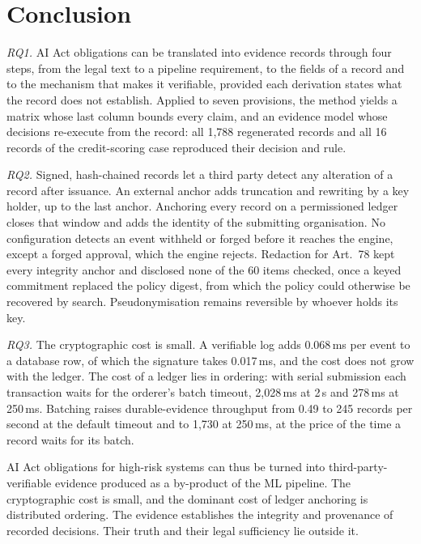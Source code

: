 \section{Conclusion}
\label{sec:conclusion}

\emph{RQ1.} AI Act obligations can be translated into evidence records through four steps, from the legal text to a pipeline requirement, to the fields of a record and to the mechanism that makes it verifiable, provided each derivation states what the record does not establish. Applied to seven provisions, the method yields a matrix whose last column bounds every claim, and an evidence model whose decisions re-execute from the record: all 1,788 regenerated records and all 16 records of the credit-scoring case reproduced their decision and rule.

\emph{RQ2.} Signed, hash-chained records let a third party detect any alteration of a record after issuance. An external anchor adds truncation and rewriting by a key holder, up to the last anchor. Anchoring every record on a permissioned ledger closes that window and adds the identity of the submitting organisation. No configuration detects an event withheld or forged before it reaches the engine, except a forged approval, which the engine rejects. Redaction for Art.~78 kept every integrity anchor and disclosed none of the 60 items checked, once a keyed commitment replaced the policy digest, from which the policy could otherwise be recovered by search. Pseudonymisation remains reversible by whoever holds its key.

\emph{RQ3.} The cryptographic cost is small. A verifiable log adds 0.068\,ms per event to a database row, of which the signature takes 0.017\,ms, and the cost does not grow with the ledger. The cost of a ledger lies in ordering: with serial submission each transaction waits for the orderer's batch timeout, 2,028\,ms at 2\,s and 278\,ms at 250\,ms. Batching raises durable-evidence throughput from 0.49 to 245 records per second at the default timeout and to 1,730 at 250\,ms, at the price of the time a record waits for its batch.

AI Act obligations for high-risk systems can thus be turned into third-party-verifiable evidence produced as a by-product of the ML pipeline. The cryptographic cost is small, and the dominant cost of ledger anchoring is distributed ordering. The evidence establishes the integrity and provenance of recorded decisions. Their truth and their legal sufficiency lie outside it.


